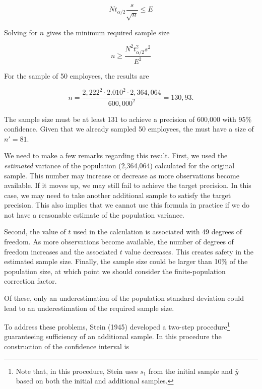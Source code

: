 \begin{equation*}
  N t_{\alpha/2} \frac{s}{\sqrt{n}} \leq E
\end{equation*}

Solving for $n$ gives the minimum required sample size

\begin{equation}
\label{eq:minimum_sample_size}
  n \geq \frac{N^2 t_{\alpha/2}^2 s^2}{E^2}
\end{equation}

For the sample of 50 employees, the results are

\begin{equation*}
  n = \frac{2,222^2 \cdot 2.010^2 \cdot 2,364,064}{600,000^2} = 130,93.
\end{equation*}

The sample size must be at least 131 to achieve a precision of 600,000 with 95\% confidence. Given that we already sampled 50 employees, the  must have a size of $n' = 81$.

We need to make a few remarks regarding this result. First, we used the \emph{estimated} variance of the population (2,364,064) calculated for the original sample. This number may increase or decrease as more observations become available. If it moves up, we may still fail to achieve the target precision. In this case, we may need to take another additional sample to satisfy the target precision. This also implies that we cannot use this formula in practice if we do not have a reasonable estimate of the population variance. 

Second, the value of $t$ used in the calculation is associated with 49 degrees of freedom. As more observations become available, the number of degrees of freedom increases and the associated $t$ value decreases. This creates safety in the estimated sample size. Finally, the sample size could be larger than 10\% of the population size, at which point we should consider the finite-population correction factor.

Of these, only an underestimation of the population standard deviation could lead to an underestimation of the required sample size. 

To address these problems, Stein (1945) developed a two-step procedure\footnote{Note that, in this procedure, Stein uses $s_1$ from the initial sample and $\bar{y}$ based on both the initial and additional samples.} guaranteeing sufficiency of an additional sample. In this procedure the construction of the confidence interval is

